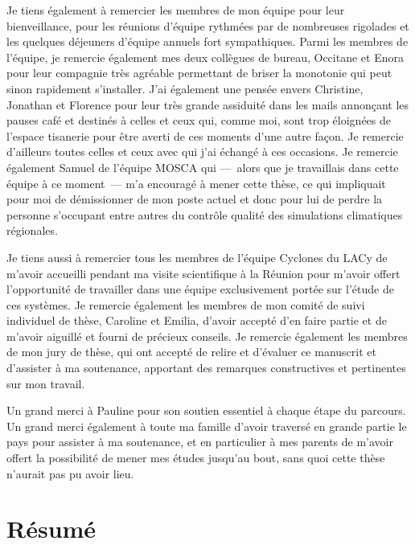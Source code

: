 \documentclass[12pt,twoside,openright]{book}
\begin{document}
\begin{acknowledgements}
            Je tiens également à remercier les membres de mon équipe pour leur bienveillance, pour les réunions d'équipe rythmées par de nombreuses rigolades et
            les quelques déjeuners d'équipe annuels fort sympathiques. Parmi les membres de l'équipe, je remercie également mes deux collègues de bureau,
            Occitane et Enora pour leur compagnie très agréable permettant de briser la monotonie qui peut sinon rapidement s'installer. J'ai également une
            pensée envers Christine, Jonathan et Florence pour leur très grande assiduité dans les mails annonçant les pauses café et destinés à celles et ceux
            qui, comme moi, sont trop éloigné\textperiodcentered es de l'espace tisanerie pour être averti de ces moments d'une autre façon. Je remercie
            d'ailleurs toutes celles et ceux avec qui j'ai échangé à ces occasions. Je remercie également Samuel de l'équipe MOSCA qui ---~alors que je
            travaillais dans cette équipe à ce moment~--- m'a encouragé à mener cette thèse, ce qui impliquait pour moi de démissionner de mon poste actuel et
            donc pour lui de perdre la personne s'occupant entre autres du contrôle qualité des simulations climatiques régionales.

            Je tiens aussi à remercier tous les membres de l'équipe Cyclones du LACy de m'avoir accueilli pendant ma visite scientifique à la Réunion pour
            m'avoir offert l'opportunité de travailler dans une équipe exclusivement portée sur l'étude de ces systèmes. Je remercie également les membres de
            mon comité de suivi individuel de thèse, Caroline et Emilia, d'avoir accepté d'en faire partie et de m'avoir aiguillé et fourni de précieux
            conseils. Je remercie également les membres de mon jury de thèse, qui ont accepté de relire et d'évaluer ce manuscrit et d'assister à ma soutenance,
            apportant des remarques constructives et pertinentes sur mon travail.

            Un grand merci à Pauline pour son soutien essentiel à chaque étape du parcours. Un grand merci également à toute ma famille d'avoir traversé en
            grande partie le pays pour assister à ma soutenance, et en particulier à mes parents de m'avoir offert la possibilité de mener mes études jusqu'au
            bout, sans quoi cette thèse n'aurait pas pu avoir lieu.
        \end{acknowledgements}

\chapter*{Résumé}
\vspace{-1cm}
\end{document}
